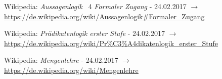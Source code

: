 \documentclass[english,ngerman,parskip=half,headsepline,footsepline]{scrreprt}
\begin{document}
\begin{flushleft}
\begin{thebibliography}{12}
			Wikipedia: \emph{Aussagenlogik} \chaptername~4 \emph{Formaler Zugang} - 24.02.2017 $\rightarrow$ \url{https://de.wikipedia.org/wiki/Aussagenlogik#Formaler_Zugang}

			Wikipedia: \emph{Prädikatenlogik erster Stufe} - 24.02.2017  $\rightarrow$ \url{https://de.wikipedia.org/wiki/Pr%C3%A4dikatenlogik_erster_Stufe}

			Wikipedia: \emph{Mengenlehre} - 24.02.2017  $\rightarrow$ \url{https://de.wikipedia.org/wiki/Mengenlehre}

		\end{thebibliography}
	\end{flushleft}
	\thispagestyle{scrheadings}
\end{document}
